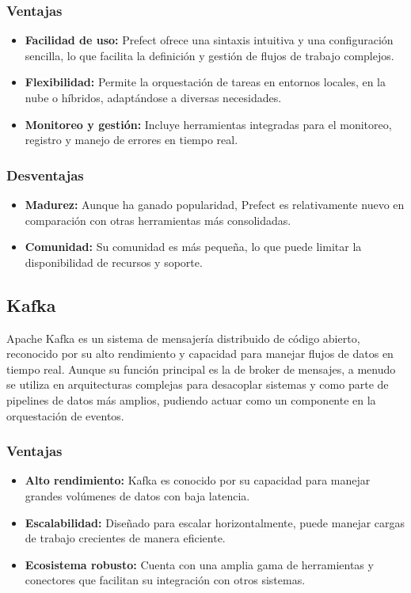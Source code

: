 \subsubsection{Ventajas}
\begin{itemize}
\item \textbf{Facilidad de uso:} Prefect ofrece una sintaxis intuitiva y una configuración sencilla, lo que facilita la definición y gestión de flujos de trabajo complejos.
\item \textbf{Flexibilidad:} Permite la orquestación de tareas en entornos locales, en la nube o híbridos, adaptándose a diversas necesidades.
\item \textbf{Monitoreo y gestión:} Incluye herramientas integradas para el monitoreo, registro y manejo de errores en tiempo real.
\end{itemize}

\subsubsection{Desventajas}
\begin{itemize}
\item \textbf{Madurez:} Aunque ha ganado popularidad, Prefect es relativamente nuevo en comparación con otras herramientas más consolidadas.
\item \textbf{Comunidad:} Su comunidad es más pequeña, lo que puede limitar la disponibilidad de recursos y soporte.
\end{itemize}

\subsection{Kafka}
Apache Kafka es un sistema de mensajería distribuido de código abierto, reconocido por su alto rendimiento y capacidad para manejar flujos de datos en tiempo real. Aunque su función principal es la de broker de mensajes, a menudo se utiliza en arquitecturas complejas para desacoplar sistemas y como parte de pipelines de datos más amplios, pudiendo actuar como un componente en la orquestación de eventos.

\subsubsection{Ventajas}
\begin{itemize}
\item \textbf{Alto rendimiento:} Kafka es conocido por su capacidad para manejar grandes volúmenes de datos con baja latencia.
\item \textbf{Escalabilidad:} Diseñado para escalar horizontalmente, puede manejar cargas de trabajo crecientes de manera eficiente.
\item \textbf{Ecosistema robusto:} Cuenta con una amplia gama de herramientas y conectores que facilitan su integración con otros sistemas.
\end{itemize}


